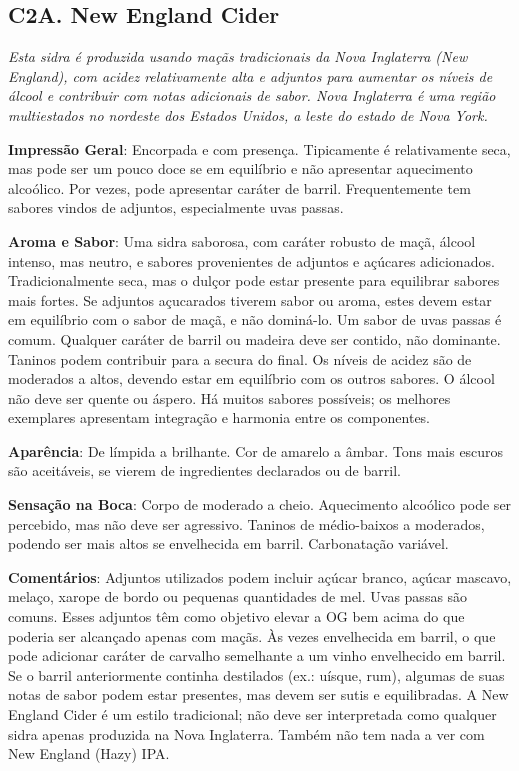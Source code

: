 \subsection*{C2A. New England Cider}

\textit{Esta sidra é produzida usando maçãs tradicionais da Nova Inglaterra (New England), com acidez relativamente alta e adjuntos para aumentar os níveis de álcool e contribuir com notas adicionais de sabor. Nova Inglaterra é uma região multiestados no nordeste dos Estados Unidos, a leste do estado de Nova York.}

\textbf{Impressão Geral}: Encorpada e com presença. Tipicamente é relativamente seca, mas pode ser um pouco doce se em equilíbrio e não apresentar aquecimento alcoólico. Por vezes, pode apresentar caráter de barril. Frequentemente tem sabores vindos de adjuntos, especialmente uvas passas.

\textbf{Aroma e Sabor}: Uma sidra saborosa, com caráter robusto de maçã, álcool intenso, mas neutro, e sabores provenientes de adjuntos e açúcares adicionados. Tradicionalmente seca, mas o dulçor pode estar presente para equilibrar sabores mais fortes. Se adjuntos açucarados tiverem sabor ou aroma, estes devem estar em equilíbrio com o sabor de maçã, e não dominá-lo. Um sabor de uvas passas é comum. Qualquer caráter de barril ou madeira deve ser contido, não dominante. Taninos podem contribuir para a secura do final. Os níveis de acidez são de moderados a altos, devendo estar em equilíbrio com os outros sabores. O álcool não deve ser quente ou áspero. Há muitos sabores possíveis; os melhores exemplares apresentam integração e harmonia entre os componentes.

\textbf{Aparência}: De límpida a brilhante. Cor de amarelo a âmbar. Tons mais escuros são aceitáveis, se vierem de ingredientes declarados ou de barril.

\textbf{Sensação na Boca}: Corpo de moderado a cheio. Aquecimento alcoólico pode ser percebido, mas não deve ser agressivo. Taninos de médio-baixos a moderados, podendo ser mais altos se envelhecida em barril. Carbonatação variável.

\textbf{Comentários}: Adjuntos utilizados podem incluir açúcar branco, açúcar mascavo, melaço, xarope de bordo ou pequenas quantidades de mel. Uvas passas são comuns. Esses adjuntos têm como objetivo elevar a OG bem acima do que poderia ser alcançado apenas com maçãs. Às vezes envelhecida em barril, o que pode adicionar caráter de carvalho semelhante a um vinho envelhecido em barril. Se o barril anteriormente continha destilados (ex.: uísque, rum), algumas de suas notas de sabor podem estar presentes, mas devem ser sutis e equilibradas. A New England Cider é um estilo tradicional; não deve ser interpretada como qualquer sidra apenas produzida na Nova Inglaterra. Também não tem nada a ver com New England (Hazy) IPA.

